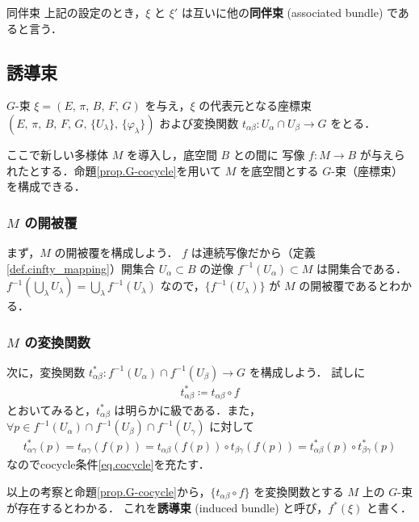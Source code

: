 \documentclass[geometry_main]{subfiles}
\begin{document}
\begin{mydef}[label=associatedbundle]{同伴束}
	上記の設定のとき，$\xi$ と $\xi'$ は互いに他の\textbf{同伴束} (associated bundle) であると言う．
\end{mydef}

\subsection{誘導束}

$G$-束 $\xi = (E,\, \pi,\, B,\, F,\, G)$ を与え，$\xi$ の代表元となる座標束 $(E,\, \pi,\, B,\, F,\, G,\, \{U_\lambda\},\, \{\varphi_\lambda\})$ および変換関数 $t_{\alpha\beta} \colon U_\alpha \cap U_\beta \to G$ をとる．

ここで新しい\cinfty 多様体 $M$ を導入し，底空間 $B$ との間に \cinfty 写像 $f\colon M \to B$ が与えられたとする．命題\ref{prop.G-cocycle}を用いて $M$ を底空間とする $G$-束（座標束）を構成できる．

\subsubsection*{$M$ の開被覆}

まず，$M$ の開被覆を構成しよう．
$f$ は連続写像だから（定義\ref{def.cinfty_mapping}）開集合 $U_\alpha \subset B$ の逆像 $f^{-1}(U_\alpha) \subset M$ は開集合である．$f^{-1}(\bigcup_\lambda U_\lambda) = \bigcup_\lambda f^{-1}(U_\lambda)$ なので，$\{f^{-1}(U_\lambda)\}$ が $M$ の開被覆であるとわかる．

\subsubsection*{$M$ の変換関数}

次に，変換関数 $t^*_{\alpha\beta} \colon f^{-1}(U_\alpha) \cap f^{-1}(U_\beta) \to G$ を構成しよう．
試しに
\begin{align}
	t^*_{\alpha\beta} \coloneqq t_{\alpha\beta} \circ f
\end{align}
とおいてみると，$t^*_{\alpha\beta}$ は明らかに\cinfty 級である．また，$\forall p \in f^{-1}(U_\alpha) \cap f^{-1}(U_\beta) \cap f^{-1}(U_\gamma)$ に対して
\begin{align}
	t^*_{\alpha\gamma}(p) = t_{\alpha\gamma}(f(p)) = t_{\alpha\beta}(f(p)) \circ t_{\beta\gamma}(f(p)) = t^*_{\alpha\beta}(p) \circ t^*_{\beta\gamma}(p)
\end{align}
なのでcocycle条件\eqref{eq.cocycle}を充たす．

\begin{tcolorbox}
	以上の考察と命題\ref{prop.G-cocycle}から，$\{t_{\alpha\beta} \circ f\}$ を変換関数とする $M$ 上の $G$-束が存在するとわかる．
	これを\textbf{誘導束} (induced bundle) と呼び，$f^*(\xi)$ と書く．
\end{tcolorbox}
\end{document}
